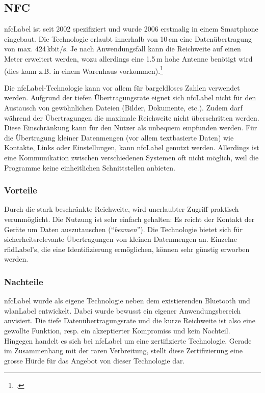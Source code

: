 \subsection{NFC}
\gls{nfcLabel} ist seit 2002 spezifiziert und wurde 2006 erstmalig in einem Smartphone eingebaut.
Die Technologie erlaubt innerhalb von 10\,cm eine Datenübertragung von max. 424\,kbit/s.
Je nach Anwendungsfall kann die Reichweite auf einen Meter erweitert werden, wozu allerdings eine 1.5\,m hohe Antenne benötigt wird (dies kann z.B. in einem Warenhaus vorkommen).\footcite{Near_Field_Communication_Wikipedia_2015-05-22}

Die \gls{nfcLabel}-Technologie kann vor allem für bargeldloses Zahlen verwendet werden.
Aufgrund der tiefen Übertragungsrate eignet sich \gls{nfcLabel} nicht für den Austausch von gewöhnlichen Dateien (Bilder, Dokumente, etc.).
Zudem darf während der Übertragungen die maximale Reichweite nicht überschritten werden.
Diese Einschränkung kann für den Nutzer als unbequem empfunden werden.
Für die Übertragung kleiner Datenmengen (vor allem textbasierte Daten) wie Kontakte, Links oder Einstellungen, kann \gls{nfcLabel} genutzt werden. Allerdings ist eine Kommunikation zwischen verschiedenen Systemen oft nicht möglich, weil die Programme keine einheitlichen Schnittstellen anbieten.

\subsubsection{Vorteile}
Durch die stark beschränkte Reichweite, wird unerlaubter Zugriff praktisch verunmöglicht.
Die Nutzung ist sehr einfach gehalten: Es reicht der Kontakt der Geräte um Daten auszutauschen ("`\textit{beamen}"').
Die Technologie bietet sich für sicherheitsrelevante Übertragungen von kleinen Datenmengen an.
Einzelne \gls{rfidLabel}'s, die eine Identifizierung ermöglichen, können sehr günstig erworben werden.

\subsubsection{Nachteile}
\gls{nfcLabel} wurde als eigene Technologie neben dem existierenden Bluetooth und \gls{wlanLabel} entwickelt.
Dabei wurde bewusst ein eigener Anwendungsbereich anvisiert.
Die tiefe Datenübertragungsrate und die kurze Reichweite ist also eine gewollte Funktion, resp. ein akzeptierter Kompromiss und kein Nachteil.
Hingegen handelt es sich bei \gls{nfcLabel} um eine zertifizierte Technologie.
Gerade im Zusammenhang mit der raren Verbreitung, stellt diese Zertifizierung eine grosse Hürde für das Angebot von dieser Technologie dar.




